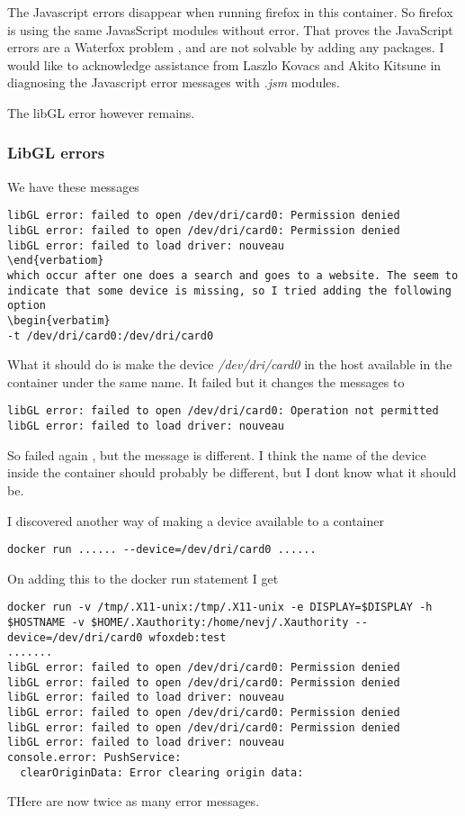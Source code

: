 \documentclass{article}  %
\begin{document}
The Javascript errors disappear when running firefox in this container. So firefox is using  the same JavasScript modules without error. That proves the JavaScript errors are a Waterfox problem , and are not solvable by adding any packages.
I would like to acknowledge assistance from Laszlo Kovacs and Akito Kitsune in diagnosing the Javascript error messages with {\em .jsm} modules.

The libGL error however remains.

\subsubsection{LibGL errors}
We have these  messages
\begin{verbatim}
libGL error: failed to open /dev/dri/card0: Permission denied
libGL error: failed to open /dev/dri/card0: Permission denied
libGL error: failed to load driver: nouveau
\end{verbatiom}
which occur after one does a search and goes to a website. The seem to indicate that some device is missing, so I tried adding the following option
\begin{verbatim}
-t /dev/dri/card0:/dev/dri/card0
\end{verbatim}
What it should do is make the device {\em /dev/dri/card0} in the host available in the container under the same name. 
It failed but it changes the messages to
\begin{verbatim}
libGL error: failed to open /dev/dri/card0: Operation not permitted
libGL error: failed to load driver: nouveau
\end{verbatim}
So failed again , but the message is different. 
I think the name of the device inside the container should probably be different, but I dont know what it should be.

I discovered another way of making a device available to a container
\begin{verbatim}
docker run ...... --device=/dev/dri/card0 ......
\end{verbatim}
On adding this to the docker run statement I get
\begin{verbatim} 
docker run -v /tmp/.X11-unix:/tmp/.X11-unix -e DISPLAY=$DISPLAY -h $HOSTNAME -v $HOME/.Xauthority:/home/nevj/.Xauthority --device=/dev/dri/card0 wfoxdeb:test
.......
libGL error: failed to open /dev/dri/card0: Permission denied
libGL error: failed to open /dev/dri/card0: Permission denied
libGL error: failed to load driver: nouveau
libGL error: failed to open /dev/dri/card0: Permission denied
libGL error: failed to open /dev/dri/card0: Permission denied
libGL error: failed to load driver: nouveau
console.error: PushService: 
  clearOriginData: Error clearing origin data:
\end{verbatim}
THere are now twice as many error messages.
\end{document}
